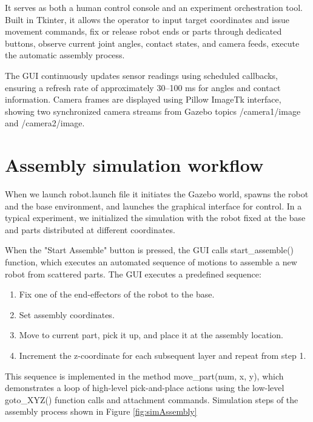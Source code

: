 It serves as both a human control console and 
an experiment orchestration tool. Built in Tkinter, it allows the operator 
to input target coordinates and issue movement commands,
fix or release robot ends or parts through dedicated buttons,
observe current joint angles, contact states, and camera feeds,
execute the automatic assembly process.

The GUI continuously updates sensor readings using scheduled callbacks,
ensuring a refresh rate of approximately 30–100 ms for 
angles and contact information. 
Camera frames are displayed using Pillow ImageTk interface, 
showing two synchronized camera streams from Gazebo 
topics /camera1/image and /camera2/image.

\section{Assembly simulation workflow}

When we launch robot.launch file it initiates the Gazebo world, 
spawns the robot and the base environment,
and launches the graphical interface for control. 
In a typical experiment, we initialized the simulation with the robot fixed at the base 
and  parts distributed at different coordinates. 

When the "Start Assemble" button is pressed, the GUI calls start\_assemble()
function, which executes an automated sequence of motions to assemble a 
new robot from scattered parts. The GUI executes a predefined sequence:
\begin{enumerate}
\item Fix one of the end-effectors of the robot to the base.
\item Set assembly coordinates.
\item Move to current part, pick it up, and place it at the assembly location.
\item Increment the z-coordinate for each subsequent layer and repeat from step 1.
\end{enumerate}

This sequence is implemented in the method move\_part(num, x, y), which 
demonstrates a loop of high-level pick-and-place actions using the low-level 
goto\_XYZ() function calls and attachment commands. 
Simulation steps of the assembly process shown in Figure \ref{fig:simAssembly}

